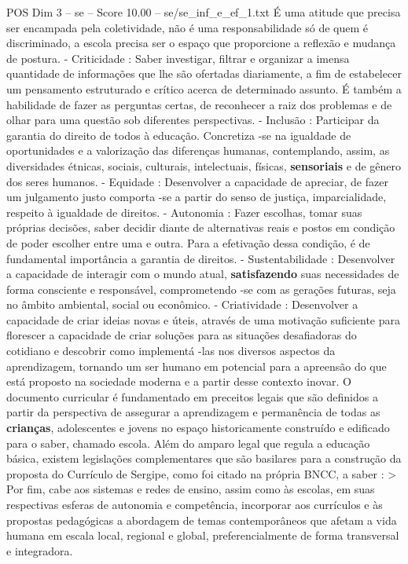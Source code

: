 \begin{textsample}{POS Dim 3 – se – Score 10.00 – se/se\_inf\_e\_ef\_1.txt}
É uma atitude que precisa ser encampada pela coletividade, não é uma responsabilidade só de quem é discriminado, a escola precisa ser o espaço que proporcione a reflexão e mudança de postura. - Criticidade : Saber investigar, filtrar e organizar a imensa quantidade de informações que lhe são ofertadas diariamente, a fim de estabelecer um pensamento estruturado e crítico acerca de determinado assunto.
É também a habilidade de fazer as perguntas certas, de reconhecer a raiz dos problemas e de olhar para uma questão sob diferentes perspectivas. - Inclusão : Participar da garantia do direito de todos à educação.
Concretiza -se na igualdade de oportunidades e a valorização das diferenças humanas, contemplando, assim, as diversidades étnicas, sociais, culturais, intelectuais, físicas, \textbf{sensoriais} e de gênero dos seres humanos. - Equidade : Desenvolver a capacidade de apreciar, de fazer um julgamento justo comporta -se a partir do senso de justiça, imparcialidade, respeito à igualdade de direitos. - Autonomia : Fazer escolhas, tomar suas próprias decisões, saber decidir diante de alternativas reais e postos em condição de poder escolher entre uma e outra.
Para a efetivação dessa condição, é de fundamental importância a garantia de direitos. - Sustentabilidade : Desenvolver a capacidade de interagir com o mundo atual, \textbf{satisfazendo} suas necessidades de forma consciente e responsável, comprometendo -se com as gerações futuras, seja no âmbito ambiental, social ou econômico. - Criatividade : Desenvolver a capacidade de criar ideias novas e úteis, através de uma motivação suficiente para florescer a capacidade de criar soluções para as situações desafiadoras do cotidiano e descobrir como implementá -las nos diversos aspectos da aprendizagem, tornando um ser humano em potencial para a apreensão do que está proposto na sociedade moderna e a partir desse contexto inovar.
O documento curricular é fundamentado em preceitos legais que são definidos a partir da perspectiva de assegurar a aprendizagem e permanência de todas as \textbf{crianças}, adolescentes e jovens no espaço historicamente construído e edificado para o saber, chamado escola.
Além do amparo legal que regula a educação básica, existem legislações complementares que são basilares para a construção da proposta do Currículo de Sergipe, como foi citado na própria BNCC, a saber : > Por fim, cabe aos sistemas e redes de ensino, assim como às escolas, em suas respectivas esferas de autonomia e competência, incorporar aos currículos e às propostas pedagógicas a abordagem de temas contemporâneos que afetam a vida humana em escala local, regional e global, preferencialmente de forma transversal e integradora.

\end{textsample}
